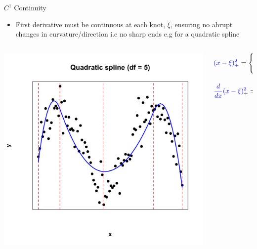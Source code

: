 \documentclass[english]{beamer}
\newcommand{\alertblue}[1]{{\color{blue}#1}}
\begin{document}
\begin{frame}{$C^1$ Continuity}
     \begin{itemize}
         \item \alertblue{First derivative} must be continuous at each knot, $\xi$, ensuring \alertblue{no abrupt changes in curvature/direction i.e no sharp ends} e.g for a \alertblue{quadratic spline}
     \end{itemize}    
    \begin{columns}
        \begin{column}{0.5\textwidth}
            \centering
            \includegraphics[width=\linewidth]{images/quadratic_spline.jpeg} 
        \end{column}
        \begin{column}{0.65\textwidth}
            \begin{equation*}
           \alertblue{(x - \xi)^2_+} = 
           \begin{cases} 
           \alertblue{(x - \xi)^2}, & x > \xi \\ 
           0, & x \leq \xi 
           \end{cases}
        \end{equation*}
        
        \begin{equation*}
         \alertblue{\frac{d}{dx}(x - \xi)^2_+} = 
         \begin{cases} 
         \alertblue{2(x - \xi)}, & x > \xi \\ 
         0, & x \leq \xi 
         \end{cases}
       \end{equation*} 
        \end{column}
    \end{columns}
\end{frame}
\end{document}
